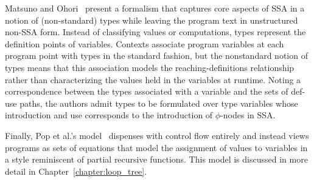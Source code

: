 Matsuno and Ohori~\cite{DBLP:conf/ppdp/MatsunoO06} present a formalism
that captures core aspects of SSA in a notion of (non-standard) types
while leaving the program text in unstructured non-SSA form. Instead
of classifying values or computations, types represent the definition
points of variables. Contexts associate program variables at each
program point with types in the standard fashion, but the nonstandard
notion of types means that this association models the
reaching-definitions relationship rather than characterizing the
values held in the variables at runtime.  Noting a correspondence
between the types associated with a variable and the sets of def-use
paths, the authors admit types to be formulated over type variables
whose introduction and use corresponds to the introduction of
$\phi$-nodes in SSA.

Finally, Pop et al.'s model~\cite{PopJS2007} dispenses with control
flow entirely and instead views programs as sets of equations that
model the assignment of values to variables in a style reminiscent of
partial recursive functions. This model is discussed in more detail in
Chapter~\ref{chapter:loop_tree}.


